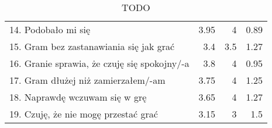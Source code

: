 \begin{table}[h!]
\begin{center}
\begin{tabular}{|m{10em}|r|r|r|}
            14. Podobało mi się                                               & 3.95          & 4       & 0.89           \\
            15. Gram bez zastanawiania się jak grać                           & 3.4           & 3.5     & 1.27           \\
            16. Granie sprawia, \newline że czuję się spokojny/-a             & 3.8           & 4       & 0.95           \\
            17. Gram dłużej \newline niż zamierzałem/-am                      & 3.75          & 4       & 1.25           \\
            18. Naprawdę wczuwam się w grę                                    & 3.65          & 4       & 1.27           \\
            19. Czuję, że nie mogę przestać grać                              & 3.15          & 3       & 1.5            \\
            \hline
        \end{tabular}
    \end{center}
    \caption{TODO}\label{tab1:ch7_7}
\end{table}

